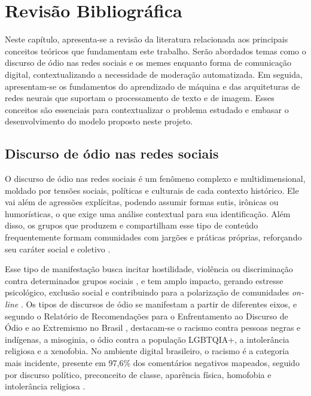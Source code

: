 

\chapter{Revisão Bibliográfica}
\label{cap:02}

Neste capítulo, apresenta-se a revisão da literatura relacionada aos principais conceitos teóricos que fundamentam este trabalho. Serão abordados temas como o discurso de ódio nas redes sociais e os memes enquanto forma de comunicação digital, contextualizando a necessidade de moderação automatizada. Em seguida, apresentam-se os fundamentos do aprendizado de máquina e das arquiteturas de redes neurais que suportam o processamento de texto e de imagem. Esses conceitos são essenciais para contextualizar o problema estudado e embasar o desenvolvimento do modelo proposto neste projeto.

\section{Discurso de ódio nas redes sociais}

O discurso de ódio nas redes sociais é um fenômeno complexo e multidimensional, moldado por tensões sociais, políticas e culturais de cada contexto histórico. Ele vai além de agressões explícitas, podendo assumir formas sutis, irônicas ou humorísticas, o que exige uma análise contextual para sua identificação. Além disso, os grupos que produzem e compartilham esse tipo de conteúdo frequentemente formam comunidades com jargões e práticas próprias, reforçando seu caráter social e coletivo \cite{Ferrari2022}.

Esse tipo de manifestação busca incitar hostilidade, violência ou discriminação contra determinados grupos sociais \cite{fortuna2018}, e tem amplo impacto, gerando estresse psicológico, exclusão social e contribuindo para a polarização de comunidades \textit{on-line} \cite{waseem2017}. Os tipos de discursos de ódio se manifestam a partir de diferentes eixos, e segundo o Relatório de Recomendações para o Enfrentamento ao Discurso de Ódio e ao Extremismo no Brasil \cite{SECOM2023}, destacam-se o racismo contra pessoas negras e indígenas, a misoginia, o ódio contra a população LGBTQIA+, a intolerância religiosa e a xenofobia. No ambiente digital brasileiro, o racismo é a categoria mais incidente, presente em 97,6\% dos comentários negativos mapeados, seguido por discurso político, preconceito de classe, aparência física, homofobia e intolerância religiosa \cite{comunicaquemuda2016}.

